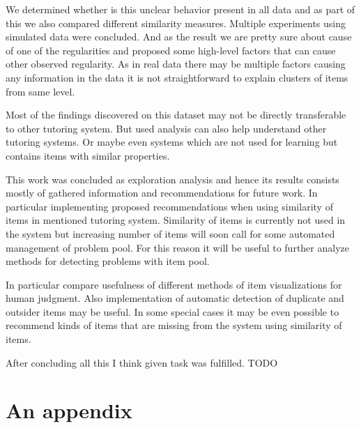 \documentclass[
  digital, %
  table,   %
  nolof,     %
  nolot,     %
  nocover,
  color
]{fithesis3}
\begin{document}
We determined whether is this unclear behavior present in all data and as part of this we also compared different similarity measures. Multiple experiments using simulated data were concluded. And as the result we are pretty sure about cause of one of the regularities and proposed some high-level factors that can cause other observed regularity. As in real data there may be multiple factors causing any information in the data it is not straightforward to explain clusters of items from same level.

Most of the findings discovered on this dataset may not be directly transferable to other tutoring system. But used analysis can also help understand other tutoring systems. Or maybe even systems which are not used for learning but contains items with similar properties.


This work was concluded as exploration analysis and hence its results consists mostly of gathered information and recommendations for future work. In particular implementing proposed recommendations when using similarity of items in mentioned tutoring system. Similarity of items is currently not used in the system \umimeCesky{} but increasing number of items will soon call for some automated management of problem pool. For this reason it will be useful to further analyze methods for detecting problems with item pool.

In particular compare usefulness of different methods of item visualizations for human judgment. Also implementation of automatic detection of duplicate and outsider items may be useful. In some special cases it may be even possible to recommend kinds of items that are missing from the system using similarity of items.


After concluding all this I think given task was fulfilled. TODO


\makeatletter\thesis@blocks@clear\makeatother

\appendix %
\chapter{An appendix}
\end{document}
